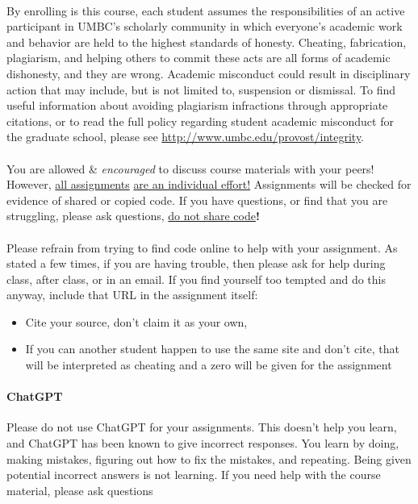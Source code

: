 \documentclass[letter,11pt]{article}
\begin{document}
\paragraph{}By enrolling is this course, each student assumes the responsibilities of an active participant in UMBC's scholarly community in which everyone's academic work and behavior are held to the highest standards of honesty. Cheating, fabrication, plagiarism, and helping others to commit these acts are all forms of academic dishonesty, and they are wrong. Academic misconduct could result in disciplinary action that may include, but is not limited to, suspension or dismissal. To find useful information about avoiding plagiarism infractions through appropriate citations, or to read the full policy regarding student academic misconduct for the graduate school, please see \url{http://www.umbc.edu/provost/integrity}.

\paragraph{}You are allowed \& \textit{encouraged} to discuss course materials with your peers! However, \underline{all assignments} \underline{are an individual effort!} Assignments will be checked for evidence of shared or copied code. If you have questions, or find that you are struggling, please ask questions, \underline{do not share code}\textbf{!}

\paragraph{}Please refrain from trying to find code online to help with your assignment. As stated a few times, if you are having trouble, then please ask for help during class, after class, or in an email. If you find yourself too tempted and do this anyway, include that URL in the assignment itself:
\begin{itemize}
\item Cite your source, don't claim it as your own,
\item If you can another student happen to use the same site and don't cite, that will be interpreted as cheating and a zero will be given for the assignment
\end{itemize}

\paragraph{ChatGPT} Please do not use ChatGPT for your assignments. This doesn't help you learn, and ChatGPT has been known to give incorrect responses. You learn by doing, making mistakes, figuring out how to fix the mistakes, and repeating. Being given potential incorrect answers is not learning. If you need help with the course material, please ask questions
\end{document}
